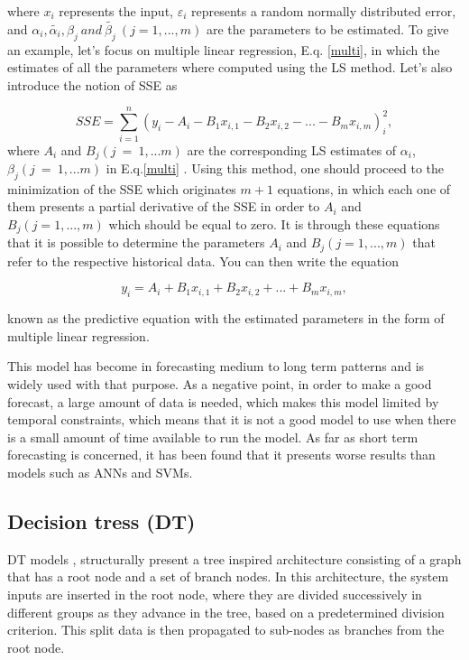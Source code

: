 where $x_i$ represents the input, $\varepsilon_i$ represents a random normally distributed error, and  $\alpha_i, \tilde{\alpha_i}, \beta_j\  and\  \tilde{\beta_j}\ (j=1,...,m)$ are the parameters to be estimated. To give an example, let's focus on multiple linear regression, E.q. \ref{multi}, in which the estimates of all the parameters where computed using the \ac{LS} method. Let's also introduce the notion of \ac{SSE} as

\begin{equation}
       SSE = \sum_{i=1}^n (y_i-A_i-B_1 x_{i,1} - B_2 x_{i,2} - ... - B_m x_{i,m})_i^2,
\label{SSE}
\end{equation}
 where $A_i$ and $B_j(j\ =\ 1,...m)$ are the corresponding \ac{LS} estimates of $\alpha_i$, $\beta_j(j\ =\ 1,...m)$ in E.q.\ref{multi} \cite{review2017}. Using this method, one should proceed to the minimization of the SSE which originates $m+1$ equations, in which each one of them presents a partial derivative of the \ac{SSE} in order to $A_i$ and $B_j(j=1,...,m)$ which should be equal to zero. It is through these equations that it is possible to determine the parameters $A_i$ and $B_j(j=1,...,m)$ that refer to the respective historical data. You can then write the equation
 
\begin{equation}
       y_i = A_i + B_1 x_{i,1} +  B_2 x_{i,2} + ... + B_m x_{i,m},
\label{y_i}
\end{equation}

known as the predictive equation with the estimated parameters in the form of multiple linear regression.
 
This model has become in forecasting medium to long term patterns and is widely used with that purpose. As a negative point, in order to make a good forecast, a large amount of data is needed, which makes this model limited by temporal constraints, which means that it is not a good model to use when there is a small amount of time available to run the model. As far as short term forecasting is concerned, it has been found that it presents worse results than models such as \ac{ANN}s and \ac{SVM}s.

\subsection{Decision tress (DT)}

\ac{DT} models \cite{dt1}, structurally present a tree inspired architecture consisting of a graph that has a root node and a set of branch nodes. In this architecture, the system inputs are inserted in the root node, where they are divided successively in different groups as they advance in the tree, based on a predetermined division criterion. This split data is then propagated to sub-nodes as branches from the root node.

